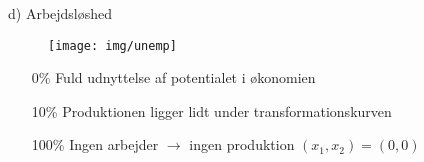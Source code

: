 \begin{frame}{d) Arbejdsløshed}

    \begin{figure}
    \centering
        \texttt{[image: img/unemp]}
  \end{figure}

  \begin{itemize}
      \item[0\%] Fuld udnyttelse af potentialet i økonomien
      \item[10\%] Produktionen ligger lidt under transformationskurven
      \item[100\%] Ingen arbejder $\rightarrow$ ingen produktion $(x_1,x_2) = (0,0)$
  \end{itemize}

\end{frame}
